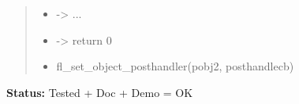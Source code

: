 \begin{boxedminipage}{\funcwidth}
\begin{quote}
\begin{itemize}
  \item {\textbar}-{\textgreater}{\textbar} ...



  \item {\textbar}-{\textgreater}{\textbar} return 0



  \item fl\_set\_object\_posthandler(pobj2, posthandlecb)



\end{itemize}

\end{quote}

\textbf{Status:} Tested + Doc + Demo = OK



    \end{boxedminipage}

    \label{xformslib:flbasic:fl_set_object_callback}

    \vspace{0.5ex}

